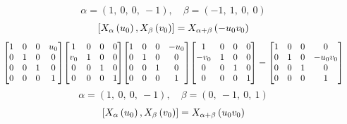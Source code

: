 \documentclass[11pt]{article}
\theoremstyle{definition}
\begin{document}
\[
\alpha = \left( 1, \  0, \  0, \  -1\right), \quad \beta = \left( -1, \  1, \  0, \  0\right)
\]
\[
\scaletoalign{\textwidth}{\left[ X_{\alpha}\left(u_{0}\right), X_{\beta}\left(v_{0}\right) \right] = X_{\alpha + \beta}\left(- u_{0} v_{0}\right)}
\]
\[
\scaletoalign{\textwidth}{{\left[\begin{matrix}1 & 0 & 0 & u_{0}\\0 & 1 & 0 & 0\\0 & 0 & 1 & 0\\0 & 0 & 0 & 1\end{matrix}\right]} {\left[\begin{matrix}1 & 0 & 0 & 0\\v_{0} & 1 & 0 & 0\\0 & 0 & 1 & 0\\0 & 0 & 0 & 1\end{matrix}\right]} {\left[\begin{matrix}1 & 0 & 0 & - u_{0}\\0 & 1 & 0 & 0\\0 & 0 & 1 & 0\\0 & 0 & 0 & 1\end{matrix}\right]} {\left[\begin{matrix}1 & 0 & 0 & 0\\- v_{0} & 1 & 0 & 0\\0 & 0 & 1 & 0\\0 & 0 & 0 & 1\end{matrix}\right]} = {\left[\begin{matrix}1 & 0 & 0 & 0\\0 & 1 & 0 & - u_{0} v_{0}\\0 & 0 & 1 & 0\\0 & 0 & 0 & 1\end{matrix}\right]}}
\]
\[
\alpha = \left( 1, \  0, \  0, \  -1\right), \quad \beta = \left( 0, \  -1, \  0, \  1\right)
\]
\[
\scaletoalign{\textwidth}{\left[ X_{\alpha}\left(u_{0}\right), X_{\beta}\left(v_{0}\right) \right] = X_{\alpha + \beta}\left(u_{0} v_{0}\right)}
\]
\end{document}
